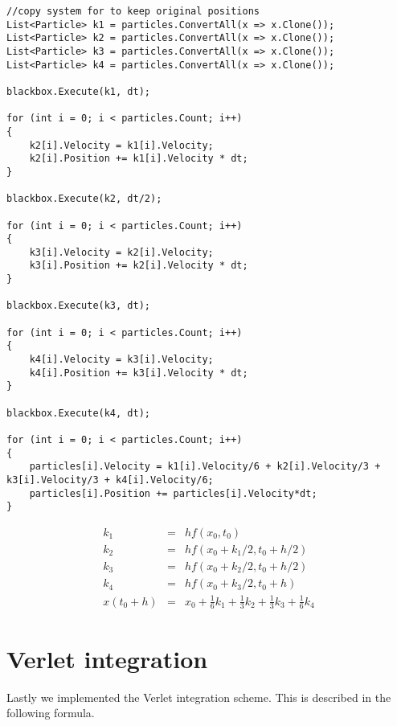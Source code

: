 \begin{lstlisting}
//copy system for to keep original positions
List<Particle> k1 = particles.ConvertAll(x => x.Clone());
List<Particle> k2 = particles.ConvertAll(x => x.Clone());
List<Particle> k3 = particles.ConvertAll(x => x.Clone());
List<Particle> k4 = particles.ConvertAll(x => x.Clone());

blackbox.Execute(k1, dt);

for (int i = 0; i < particles.Count; i++)
{
	k2[i].Velocity = k1[i].Velocity;
	k2[i].Position += k1[i].Velocity * dt;
}

blackbox.Execute(k2, dt/2);

for (int i = 0; i < particles.Count; i++)
{
	k3[i].Velocity = k2[i].Velocity;
	k3[i].Position += k2[i].Velocity * dt;
}

blackbox.Execute(k3, dt);

for (int i = 0; i < particles.Count; i++)
{
	k4[i].Velocity = k3[i].Velocity;
	k4[i].Position += k3[i].Velocity * dt;
}

blackbox.Execute(k4, dt);

for (int i = 0; i < particles.Count; i++)
{
	particles[i].Velocity = k1[i].Velocity/6 + k2[i].Velocity/3 + k3[i].Velocity/3 + k4[i].Velocity/6;
	particles[i].Position += particles[i].Velocity*dt;
}
\end{lstlisting}

\begin{eqnarray}
\label{formula:RK41}
k_1 &=& hf(x_0, t_0) \\
k_2 &=& hf(x_0 + k_1/2, t_0+h/2) \\
k_3 &=& hf(x_0 + k_2/2, t_0+h/2) \\
k_4 &=& hf(x_0 + k_3/2, t_0+h) \\
\label{formula:RK45}
x(t_0 + h) &=& x_0 + \frac{1}{6}k_1 + \frac{1}{3}k_2 + \frac{1}{3}k_3 + \frac{1}{6}k_4
\end{eqnarray}

\section{Verlet integration}
Lastly we implemented the Verlet integration scheme. This is described in the following formula.

